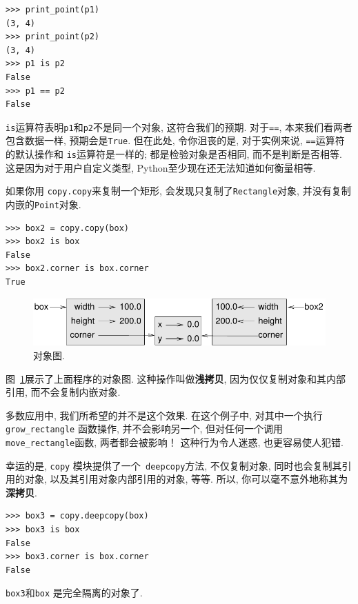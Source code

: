 \documentclass[10pt]{book}
\begin{document}
\begin{verbatim}
>>> print_point(p1)
(3, 4)
>>> print_point(p2)
(3, 4)
>>> p1 is p2
False
>>> p1 == p2
False
\end{verbatim}
%

{\tt is}运算符表明{\tt p1}和{\tt p2}不是同一个对象, 这符合我们的预期. 
对于{\tt ==}, 本来我们看两者包含数据一样, 预期会是{\tt True}. 
但在此处, 令你沮丧的是, 对于实例来说, {\tt ==}运算符的默认操作和
{\tt is}运算符是一样的; 都是检验对象是否相同, 而不是判断是否相等.
这是因为对于用户自定义类型, Python至少现在还无法知道如何衡量相等.

如果你用 {\tt copy.copy}来复制一个矩形, 
会发现只复制了{\tt Rectangle}对象, 并没有复制内嵌的{\tt Point}对象.

\begin{verbatim}
>>> box2 = copy.copy(box)
>>> box2 is box
False
>>> box2.corner is box.corner
True
\end{verbatim}

\begin{figure}
\centerline
{\includegraphics[scale=0.8]{figs/rectangle2.pdf}}
\caption{对象图.}
\label{fig.rectangle2}
\end{figure}

图~\ref{fig.rectangle2}展示了上面程序的对象图.
这种操作叫做{\bf 浅拷贝}, 因为仅仅复制对象和其内部引用, 而不会复制内嵌对象. 

多数应用中, 我们所希望的并不是这个效果. 
在这个例子中, 对其中一个执行 \verb"grow_rectangle" 函数操作, 
并不会影响另一个, 但对任何一个调用 \verb"move_rectangle"函数, 两者都会被影响！
这种行为令人迷惑, 也更容易使人犯错. 

幸运的是,  {\tt copy} 模块提供了一个{\tt
deepcopy}方法, 不仅复制对象, 同时也会复制其引用的对象, 
以及其引用对象内部引用的对象, 等等. 
所以, 你可以毫不意外地称其为{\bf 深拷贝}. 

\begin{verbatim}
>>> box3 = copy.deepcopy(box)
>>> box3 is box
False
>>> box3.corner is box.corner
False
\end{verbatim}
%
{\tt box3}和{\tt box} 是完全隔离的对象了. 
\end{document}
